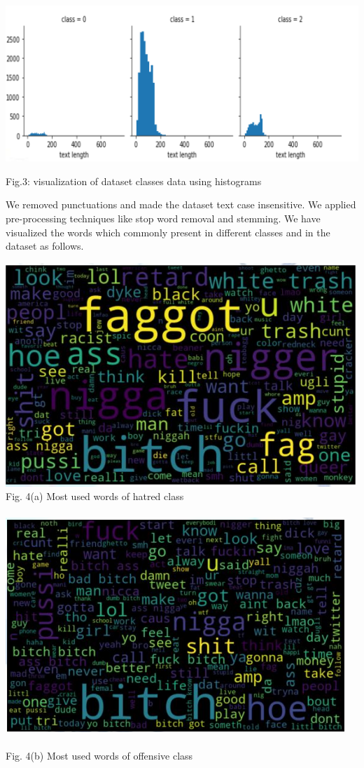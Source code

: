 \documentclass{letter}
\begin{document}
\begin{multicols}{2}
\includegraphics[width=1\linewidth]{aa}\\ 
\begin{center}Fig.3: visualization of dataset classes data using 
histograms
\end{center}
We removed punctuations and made the dataset text 
case insensitive. We applied pre-processing techniques 
like stop word removal and stemming. We have 
visualized the words which commonly present in 
different classes and in the dataset as follows.

\includegraphics[width=1\linewidth]{bb}\\ 
Fig. 4(a) Most used words of hatred class\\ \\
\includegraphics[width=1\linewidth]{cc}\\ \\ 
Fig. 4(b) Most used words of offensive class




\end{multicols}
\end{document}
